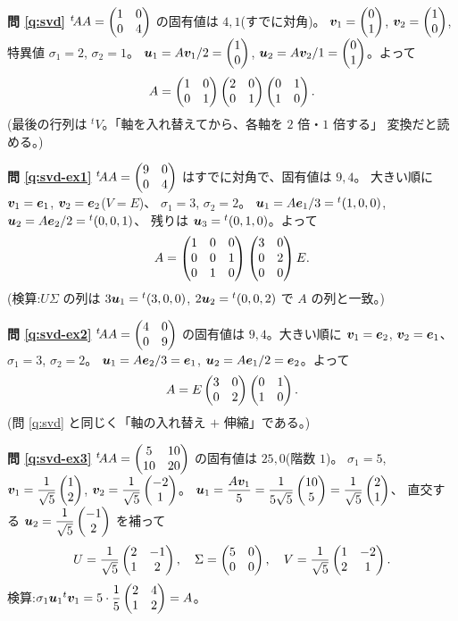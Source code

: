 \bigskip
\noindent\textbf{問 \ref{q:svd}}\quad
${}^t\!AA = \begin{pmatrix}1 & 0 \\ 0 & 4\end{pmatrix}$ の固有値は $4, 1$(すでに対角)。
$\bm{v}_1 = \begin{pmatrix}0 \\ 1\end{pmatrix}$, $\bm{v}_2 = \begin{pmatrix}1 \\ 0\end{pmatrix}$,
特異値 $\sigma_1 = 2$, $\sigma_2 = 1$。
$\bm{u}_1 = A\bm{v}_1/2 = \begin{pmatrix}1 \\ 0\end{pmatrix}$,
$\bm{u}_2 = A\bm{v}_2/1 = \begin{pmatrix}0 \\ 1\end{pmatrix}$。よって
\[
A = \begin{pmatrix}1 & 0 \\ 0 & 1\end{pmatrix}\begin{pmatrix}2 & 0 \\ 0 & 1\end{pmatrix}\begin{pmatrix}0 & 1 \\ 1 & 0\end{pmatrix}.
\]
(最後の行列は ${}^tV$。「軸を入れ替えてから、各軸を $2$ 倍・$1$ 倍する」
変換だと読める。)

\bigskip
\noindent\textbf{問 \ref{q:svd-ex1}}\quad
${}^t\!AA = \begin{pmatrix}9 & 0 \\ 0 & 4\end{pmatrix}$ はすでに対角で、固有値は $9, 4$。
大きい順に $\bm{v}_1 = \bm{e}_1$, $\bm{v}_2 = \bm{e}_2$($V = E$)、
$\sigma_1 = 3$, $\sigma_2 = 2$。
$\bm{u}_1 = A\bm{e}_1/3 = {}^t(1, 0, 0)$,
$\bm{u}_2 = A\bm{e}_2/2 = {}^t(0, 0, 1)$、
残りは $\bm{u}_3 = {}^t(0, 1, 0)$。よって
\[
A = \begin{pmatrix}1 & 0 & 0 \\ 0 & 0 & 1 \\ 0 & 1 & 0\end{pmatrix}
\begin{pmatrix}3 & 0 \\ 0 & 2 \\ 0 & 0\end{pmatrix} E.
\]
(検算:$U\Sigma$ の列は $3\bm{u}_1 = {}^t(3,0,0)$,
$2\bm{u}_2 = {}^t(0,0,2)$ で $A$ の列と一致。)

\bigskip
\noindent\textbf{問 \ref{q:svd-ex2}}\quad
${}^t\!AA = \begin{pmatrix}4 & 0 \\ 0 & 9\end{pmatrix}$ の固有値は $9, 4$。大きい順に
$\bm{v}_1 = \bm{e}_2$, $\bm{v}_2 = \bm{e}_1$、
$\sigma_1 = 3$, $\sigma_2 = 2$。
$\bm{u}_1 = A\bm{e}_2/3 = \bm{e}_1$,
$\bm{u}_2 = A\bm{e}_1/2 = \bm{e}_2$。よって
\[
A = E\begin{pmatrix}3 & 0 \\ 0 & 2\end{pmatrix}\begin{pmatrix}0 & 1 \\ 1 & 0\end{pmatrix}.
\]
(問 \ref{q:svd} と同じく「軸の入れ替え $+$ 伸縮」である。)

\bigskip
\noindent\textbf{問 \ref{q:svd-ex3}}\quad
${}^t\!AA = \begin{pmatrix}5 & 10 \\ 10 & 20\end{pmatrix}$ の固有値は $25, 0$(階数 $1$)。
$\sigma_1 = 5$,
$\bm{v}_1 = \dfrac{1}{\sqrt{5}}\begin{pmatrix}1 \\ 2\end{pmatrix}$,
$\bm{v}_2 = \dfrac{1}{\sqrt{5}}\begin{pmatrix}-2 \\ 1\end{pmatrix}$。
$\bm{u}_1 = \dfrac{A\bm{v}_1}{5}
= \dfrac{1}{5\sqrt{5}}\begin{pmatrix}10 \\ 5\end{pmatrix} = \dfrac{1}{\sqrt{5}}\begin{pmatrix}2 \\ 1\end{pmatrix}$、
直交する $\bm{u}_2 = \dfrac{1}{\sqrt{5}}\begin{pmatrix}-1 \\ 2\end{pmatrix}$ を補って
\[
U = \frac{1}{\sqrt{5}}\begin{pmatrix}2 & -1 \\ 1 & 2\end{pmatrix}, \quad
\Sigma = \begin{pmatrix}5 & 0 \\ 0 & 0\end{pmatrix}, \quad
V = \frac{1}{\sqrt{5}}\begin{pmatrix}1 & -2 \\ 2 & 1\end{pmatrix}.
\]
検算:$\sigma_1\bm{u}_1{}^t\bm{v}_1 = 5 \cdot \dfrac{1}{5}
\begin{pmatrix}2 & 4 \\ 1 & 2\end{pmatrix} = A$。

